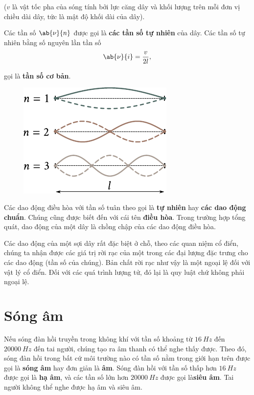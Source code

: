 \noindent
($v$ là vật tốc pha của sóng tính bởi lực căng dây và khối lượng trên mỗi đơn vị chiều dài dây, tức là mật độ khối dài của dây).

Các tần số $\ab{\nu}{n}$ được gọi là \textbf{các tần số tự nhiên} của dây. Các tần số tự nhiên bằng số nguyên lần tần số
\begin{equation*}
	\ab{\nu}{i} = \frac{v}{2l},
\end{equation*}

\noindent
gọi là \textbf{tần số cơ bản}.

\begin{figure}[!htb]
	\begin{center}
		\includegraphics[scale=1]{figures/ch_14/fig_14_12.pdf}
		\caption[]{}
		\label{fig:14_12}
	\end{center}
	\vspace{-0.8cm}
\end{figure}

Các dao động điều hòa với tần số tuân theo  gọi là \textbf{tự nhiên} hay \textbf{các dao động chuẩn}. Chúng cũng được biết đến với cái tên \textbf{điều hòa}. Trong trường hợp tổng quát, dao động của một dây là chồng chập của các dao động điều hòa.

Các dao động của một sợi dây rất đặc biệt ở chỗ, theo các quan niệm cổ điển, chúng ta nhận được các giá trị rời rạc của một trong các đại lượng đặc trưng cho các dao động (tần số của chúng). Bản chất rời rạc như vậy là một ngoại lệ đối với vật lý cổ điển. Đối với các quá trình lượng tử, đó lại là quy luật chứ không phải ngoại lệ.

\section{Sóng âm}\label{sec:14_9}

Nếu sóng đàn hồi truyền trong không khí với tần số khoảng từ $\SI{16}{Hz}$ đến $\SI{20000}{Hz}$ đến tai người, chúng tạo ra âm thanh có thể nghe thấy được. Theo đó, sóng đàn hồi trong bất cứ môi trường nào có tần số nằm trong giới hạn trên được gọi là \textbf{sóng âm} hay đơn giản là \textbf{âm}. Sóng đàn hồi với tần số thấp hơn $\SI{16}{Hz}$ được gọi là \textbf{hạ âm}, và các tần số lớn hơn $\SI{20000}{Hz}$ được gọi là\textbf{siêu âm}. Tai người không thể nghe được hạ âm và siêu âm. 

